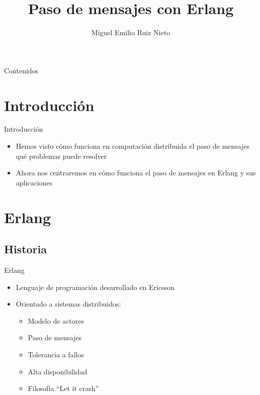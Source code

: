 \documentclass{beamer}
\title[CAP]{Paso de mensajes con Erlang}
\author[M. Ruiz (UCM)]{Miguel Emilio Ruiz Nieto}
\date{\mydate}
\begin{document}
  \begin{frame}
    \titlepage
  \end{frame}

  \begin{frame}{Contenidos}
    \tableofcontents[hideallsubsections]
  \end{frame}

  \section{Introducción}
  \begin{frame}{Introducción}
    \begin{itemize}
      \item Hemos visto cómo funciona en computación distribuida el paso de
      mensajes qué problemas puede resolver
      \item Ahora nos centraremos en cómo funciona el paso de mensajes en Erlang
      y sus aplicaciones
    \end{itemize}
  \end{frame}

  \section{Erlang}
    \subsection{Historia}
      \begin{frame}{Erlang}
        \begin{itemize}
          \item Lenguaje de programación desarrollado en Ericsson
          \item Orientado a sistemas distribuidos:
          \begin{itemize}
            \item Modelo de actores
            \item Paso de mensajes
            \item Tolerancia a fallos
            \item Alta disponibilidad
            \item Filosofía ``Let it crash''
          \end{itemize}
        \end{itemize}
      \end{frame}
\end{document}
